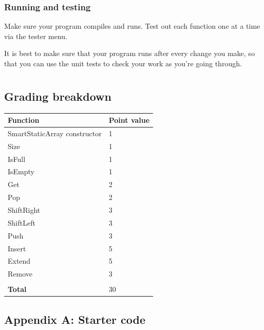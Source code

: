\documentclass[a4paper,12pt]{book}
\begin{document}
    \hrulefill{}
    \subsection*{Running and testing}

    Make sure your program compiles and runs. Test out each function
    one at a time via the tester menu.

    It is best to make sure that your program runs after every change
    you make, so that you can use the unit tests to check your work
    as you're going through.

    \newpage

\chapter*{}

\section*{Grading breakdown}

\begin{tabular}{ | p{8cm} | p{4cm} | }
    \hline
    \textbf{Function} & \textbf{Point value}
    \\ \hline
    
    SmartStaticArray constructor & 1       \\ \hline
    Size & 1       \\ \hline
    IsFull & 1       \\ \hline
    IsEmpty & 1       \\ \hline
    Get & 2       \\ \hline
    Pop & 2       \\ \hline
    ShiftRight & 3       \\ \hline
    ShiftLeft & 3       \\ \hline
    Push & 3       \\ \hline
    Insert & 5       \\ \hline
    Extend & 5       \\ \hline
    Remove & 3       \\ \hline
    & \\ \hline
    \textbf{Total} & 30
    \\ \hline    
\end{tabular}

\newpage
\section*{Appendix A: Starter code}
\end{document}
